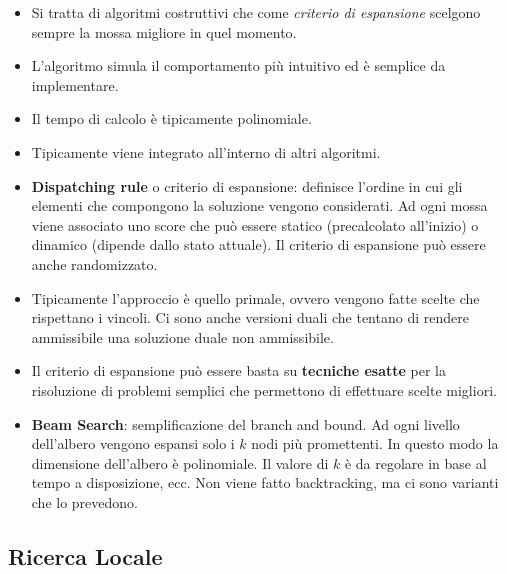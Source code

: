 \begin{itemize}
	\item Si tratta di algoritmi costruttivi che come \textit{criterio di espansione} scelgono sempre la mossa migliore in quel momento.
	\item L'algoritmo simula il comportamento più intuitivo ed è semplice da implementare.
	\item Il tempo di calcolo è tipicamente polinomiale.
	\item Tipicamente viene integrato all'interno di altri algoritmi.
	\item \textbf{Dispatching rule} o criterio di espansione: definisce l'ordine in cui gli elementi che compongono la soluzione vengono considerati. Ad ogni mossa viene associato uno score che può essere statico (precalcolato all'inizio) o dinamico (dipende dallo stato attuale). Il criterio di espansione può essere anche randomizzato.
	\item Tipicamente l'approccio è quello primale, ovvero vengono fatte scelte che rispettano i vincoli. Ci sono anche versioni duali che tentano di rendere ammissibile una soluzione duale non ammissibile.
	\item Il criterio di espansione può essere basta su \textbf{tecniche esatte} per la risoluzione di problemi semplici che permettono di effettuare scelte migliori.
	\item \textbf{Beam Search}: semplificazione del branch and bound. Ad ogni livello dell'albero vengono espansi solo i $k$ nodi più promettenti. In questo modo la dimensione dell'albero è polinomiale. Il valore di $k$ è da regolare in base al tempo a disposizione, ecc. Non viene fatto backtracking, ma ci sono varianti che lo prevedono.
\end{itemize}

\subsection{Ricerca Locale}

